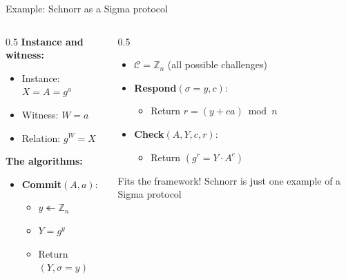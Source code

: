 \ifdefined\PRESENTATION\else\PassOptionsToClass{handout}{beamer}\fi\documentclass[aspectratio=169, lualatex]{beamer}
\begin{document}
\begin{frame}{Example: Schnorr as a Sigma protocol}
	\begin{columns}[c]
		\begin{column}{0.5\textwidth}
			\textbf{Instance and witness:}
			\begin{itemize}
				\item Instance: $X = A = g^a$
				\item Witness: $W = a$
				\item Relation: $g^W = X$
			\end{itemize}
			\textbf{The algorithms:}
			\begin{itemize}
				\item \textbf{Commit}$(A, a)$:
				      \begin{itemize}
					      \item $y \twoheadleftarrow \mathbb{Z}_n$
					      \item $Y = g^y$
					      \item Return $(Y, \sigma = y)$
				      \end{itemize}
			\end{itemize}
		\end{column}
		\begin{column}{0.5\textwidth}
			\begin{itemize}
				\item $\mathcal{C} = \mathbb{Z}_n$ (all possible challenges)
				\item \textbf{Respond}$(\sigma = y, c)$:
				      \begin{itemize}
					      \item Return $r = (y + ca) \bmod n$
				      \end{itemize}
				\item \textbf{Check}$(A, Y, c, r)$:
				      \begin{itemize}
					      \item Return $(g^r = Y \cdot A^c)$
				      \end{itemize}
			\end{itemize}
			\begin{exampleblock}{Fits the framework!}
				Schnorr is just one example of a Sigma protocol
			\end{exampleblock}
		\end{column}
	\end{columns}
\end{frame}
\end{document}

